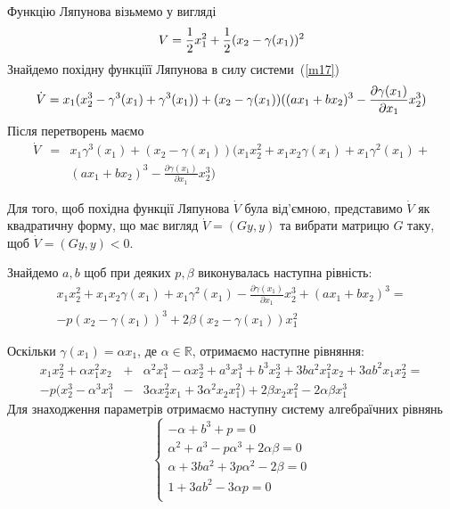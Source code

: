 \documentclass{article}
\begin{document}
Функцію Ляпунова візьмемо у вигляді  
\begin{equation}
    V = \frac{1}{2}x_{1}^2 +\frac{1}{2}(x_2 - \gamma(x_1) )^2\\
\end{equation}
Знайдемо похідну функціїї Ляпунова в силу системи~(\ref{m17})
\begin{equation}
    \dot V = x_1(x_2^3 - \gamma^3(x_1)+\gamma^3(x_1)) + \\
    (x_2 - \gamma(x_1))( (ax_1+bx_2)^3-\frac{\partial \gamma(x_1)}{\partial x_1}x_2^3)
\end{equation}
Після перетворень маємо
\begin{eqnarray}
    \dot V&=& x_1\gamma^3(x_1)+(x_2 - \gamma(x_1))
   \Big (x_1x_2^2 + x_1x_2\gamma(x_1) + x_{1}\gamma^2(x_1) +\nonumber\\ 
    &&(ax_1+bx_2)^3 - \frac{\partial \gamma(x_1)}{\partial x_1}x_{2}^3\Big)
\end{eqnarray}

Для того, щоб похідна функції Ляпунова $\dot V$ була від'ємною, представимо
 $\dot V$ як квадратичну форму, що має вигляд $\dot V =(Gy,y)$ 
та вибрати матрицю $G$ таку, щоб  $\dot V =(Gy,y) < 0$.

Знайдемо $a,b$ щоб при деяких $p, \beta$ виконувалась наступна рівність:
\begin{eqnarray}
    x_1x_2^2+x_1x_2\gamma(x_1) + x_1 \gamma^2(x_1) - 
    \frac{\partial \gamma(x_1)}{\partial x_1}x_2^3 + (ax_1+bx_2)^3 = \nonumber\\
    -p(x_2-\gamma(x_1))^3 +2\beta(x_2-\gamma(x_1))x_{1}^2 
\end{eqnarray}

Оскільки $\gamma(x_1)=\alpha x_1$, де $\alpha \in \mathbb{R}$,
отримаємо наступне рівняння:
\begin{eqnarray}
x_1x_{2}^2 + \alpha x_{1}^2x_2 &+& \alpha^2x_{1}^3 -\alpha x_{2}^3 
+ a^3x_{1}^3 + b^3x_{2}^3 + 3ba^2x_{1}^2x_2+\nonumber
3ab^2x_1x_{2}^2 =\\
-p(x_2^3 - \alpha^{3}x_{1}^3 &-& 3\alpha x_2^2x_{1} + 3\alpha^2x_2x_{1}^2)+
2\beta x_2x_{1}^2 - 2\alpha \beta x_1^3
\end{eqnarray}
Для знаходження параметрів отримаємо наступну систему алгебраїчних рівнянь 
\begin{equation}
    \begin{cases}
        -\alpha+b^3+p=0\\
        \alpha^2+a^3-p\alpha^3+2\alpha\beta=0\\
        \alpha+3ba^2+3p\alpha^2-2\beta=0\\
        1+3ab^2-3\alpha p=0\\
    \end{cases}
\end{equation}
\end{document}
